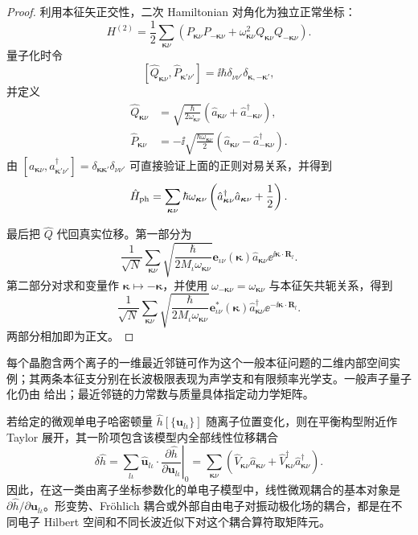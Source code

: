 \begin{proof}
利用本征矢正交性，二次 Hamiltonian 对角化为独立正常坐标：
\[
H^{(2)}
=\frac12\sum_{\boldsymbol\kappa\nu}
\left(P_{\boldsymbol\kappa\nu}P_{-\boldsymbol\kappa\nu}
+\omega_{\boldsymbol\kappa\nu}^2
Q_{\boldsymbol\kappa\nu}Q_{-\boldsymbol\kappa\nu}\right).
\]
量子化时令
\[
[\hat Q_{\boldsymbol\kappa\nu},
\hat P_{\boldsymbol\kappa'\nu'}]
=\ii\hbar\delta_{\nu\nu'}
\delta_{\boldsymbol\kappa,-\boldsymbol\kappa'},
\]
并定义
\begin{align*}
\hat Q_{\boldsymbol\kappa\nu}
&=\sqrt{\frac{\hbar}{2\omega_{\boldsymbol\kappa\nu}}}
\left(\hat a_{\boldsymbol\kappa\nu}
+\hat a_{-\boldsymbol\kappa\nu}^\dagger\right),\\
\hat P_{\boldsymbol\kappa\nu}
&=-\ii\sqrt{\frac{\hbar\omega_{\boldsymbol\kappa\nu}}2}
\left(\hat a_{\boldsymbol\kappa\nu}
-\hat a_{-\boldsymbol\kappa\nu}^\dagger\right).
\end{align*}
由 $[a_{\boldsymbol\kappa\nu},a_{\boldsymbol\kappa'\nu'}^\dagger]
=\delta_{\boldsymbol\kappa\boldsymbol\kappa'}\delta_{\nu\nu'}$ 可直接验证上面的正则对易关系，并得到
\[
\hat H_{\rm ph}
=\sum_{\boldsymbol\kappa\nu}
\hbar\omega_{\boldsymbol\kappa\nu}
\left(\hat a_{\boldsymbol\kappa\nu}^\dagger
\hat a_{\boldsymbol\kappa\nu}+\frac12\right).
\]

最后把 $\hat Q$ 代回真实位移。第一部分为
\[
\frac1{\sqrt N}\sum_{\boldsymbol\kappa\nu}
\sqrt{\frac{\hbar}{2M_\iota\omega_{\boldsymbol\kappa\nu}}}
\mathbf e_{\iota\nu}(\boldsymbol\kappa)
\hat a_{\boldsymbol\kappa\nu}
\ee^{\ii\boldsymbol\kappa\cdot\mathbf R_l}.
\]
第二部分对求和变量作 $\boldsymbol\kappa\mapsto-\boldsymbol\kappa$，并使用
$\omega_{-\boldsymbol\kappa\nu}=\omega_{\boldsymbol\kappa\nu}$ 与本征矢共轭关系，得到
\[
\frac1{\sqrt N}\sum_{\boldsymbol\kappa\nu}
\sqrt{\frac{\hbar}{2M_\iota\omega_{\boldsymbol\kappa\nu}}}
\mathbf e_{\iota\nu}^*(\boldsymbol\kappa)
\hat a_{\boldsymbol\kappa\nu}^\dagger
\ee^{-\ii\boldsymbol\kappa\cdot\mathbf R_l}.
\]
两部分相加即为正文。
\end{proof}


每个晶胞含两个离子的一维最近邻链可作为这个一般本征问题的二维内部空间实例；其两条本征支分别在长波极限表现为声学支和有限频率光学支。一般声子量子化仍由 给出；最近邻链的力常数与质量具体指定动力学矩阵。

若给定的微观单电子哈密顿量 $\hat h[\{\mathbf u_{l\iota}\}]$ 随离子位置变化，则在平衡构型附近作 Taylor 展开，其一阶项包含该模型内全部线性位移耦合
\begin{equation*}
\delta\hat h
=\sum_{l\iota}\hat{\mathbf u}_{l\iota}\cdot
\left.\frac{\partial\hat h}{\partial\mathbf u_{l\iota}}\right|_0
=\sum_{\boldsymbol\kappa\nu}
\left(\hat V_{\boldsymbol\kappa\nu}\hat a_{\boldsymbol\kappa\nu}
+\hat V_{\boldsymbol\kappa\nu}^{\dagger}\hat a_{\boldsymbol\kappa\nu}^{\dagger}\right).
\end{equation*}
因此，在这一类由离子坐标参数化的单电子模型中，线性微观耦合的基本对象是 $\partial\hat h/\partial\mathbf u_{l\iota}$。形变势、Fr\"ohlich 耦合或外部自由电子对振动极化场的耦合，都是在不同电子 Hilbert 空间和不同长波近似下对这个耦合算符取矩阵元。

